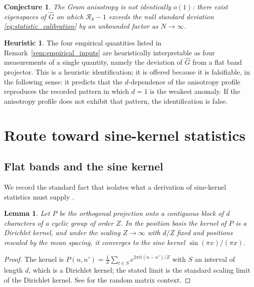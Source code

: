 \documentclass[11pt]{amsart}
\numberwithin{equation}{section}
\theoremstyle{plain}
\newtheorem{lemma}[theorem]{Lemma}
\newtheorem{conjecture}[theorem]{Conjecture}
\theoremstyle{definition}
\newtheorem{heuristic}[theorem]{Heuristic}
\theoremstyle{remark}
\begin{document}
\begin{conjecture}
\label{conj:anisotropy_nontrivial}
The Gram anisotropy is not identically $o(1)$: there exist eigenspaces
of $\widehat{G}$ on which
$\mathcal{R}_k - 1$ exceeds the null standard deviation
\eqref{eq:statistic_calibration} by an unbounded factor as
$N \to \infty$.
\end{conjecture}

\begin{heuristic}
\label{heur:defects_are_one_object}
The four empirical quantities listed in
Remark~\ref{rem:empirical_inputs} are heuristically interpretable as
four measurements of a single quantity, namely the deviation of
$\widehat{G}$ from a flat band projector. This is a heuristic
identification; it is offered because it is falsifiable, in the
following sense: it predicts that the $d$-dependence of the anisotropy
profile reproduces the recorded pattern in which $d=1$ is the weakest
anomaly. If the anisotropy profile does not exhibit that pattern, the
identification is false.
\end{heuristic}

\section{Route toward sine-kernel statistics}
\label{sec:sine_kernel}

\subsection{Flat bands and the sine kernel}
\label{subsec:flat_bands}

We record the standard fact that isolates what a derivation of
sine-kernel statistics must supply \cite{Mehta2004}.

\begin{lemma}
\label{lem:band_projector_sinc}
Let $P$ be the orthogonal projection onto a contiguous block of $d$
characters of a cyclic group of order $Z$. In the position basis the
kernel of $P$ is a Dirichlet kernel, and under the scaling
$Z \to \infty$ with $d/Z$ fixed and positions rescaled by the mean
spacing, it converges to the sine kernel
$\sin(\pi x)/(\pi x)$.
\end{lemma}

\begin{proof}
The kernel is $P(n,n') = \frac{1}{Z}\sum_{t \in S}
e^{2\pi i t (n-n')/Z}$ with $S$ an interval of length $d$, which is a
Dirichlet kernel; the stated limit is the standard scaling limit of the
Dirichlet kernel. See \cite{Mehta2004} for the random matrix context.
\end{proof}
\end{document}
